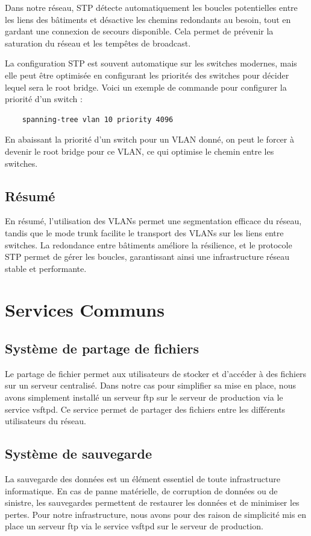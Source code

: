 \documentclass[a4paper,12pt,openany]{report}
\begin{document}
                Dans notre réseau, STP détecte automatiquement les boucles potentielles entre les liens des bâtiments et désactive les chemins redondants au besoin, tout en gardant une connexion de secours disponible. Cela permet de prévenir la saturation du réseau et les tempêtes de broadcast.

                La configuration STP est souvent automatique sur les switches modernes, mais elle peut être optimisée en configurant les priorités des switches pour décider lequel sera le root bridge. Voici un exemple de commande pour configurer la priorité d'un switch :

                \begin{verbatim}
    spanning-tree vlan 10 priority 4096
                \end{verbatim}

                En abaissant la priorité d'un switch pour un VLAN donné, on peut le forcer à devenir le root bridge pour ce VLAN, ce qui optimise le chemin entre les switches.

            \subsection{Résumé}
                En résumé, l'utilisation des VLANs permet une segmentation efficace du réseau, tandis que le mode trunk facilite le transport des VLANs sur les liens entre switches. La redondance entre bâtiments améliore la résilience, et le protocole STP permet de gérer les boucles, garantissant ainsi une infrastructure réseau stable et performante.


        \section{Services Communs}
            \subsection{Système de partage de fichiers}
                Le partage de fichier permet aux utilisateurs de stocker et d'accéder à des fichiers sur un serveur centralisé. Dans notre cas pour simplifier sa mise en place, nous avons simplement installé un serveur ftp sur le serveur de production via le service vsftpd. Ce service permet de partager des fichiers entre les différents utilisateurs du réseau.
            \subsection{Système de sauvegarde}
                La sauvegarde des données est un élément essentiel de toute infrastructure informatique. En cas de panne matérielle, de corruption de données ou de sinistre, les sauvegardes permettent de restaurer les données et de minimiser les pertes. Pour notre infrastructure, nous avons pour des raison de simplicité mis en place un serveur ftp via le service vsftpd sur le serveur de production.
\end{document}
